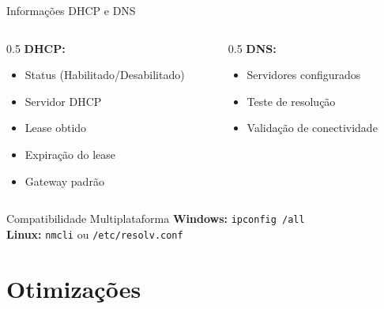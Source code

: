 \documentclass[aspectratio=169]{beamer}
\begin{document}
\begin{frame}{Informações DHCP e DNS}
\begin{columns}[T]
\begin{column}{0.5\textwidth}
\textbf{DHCP:}
\begin{itemize}
    \item Status (Habilitado/Desabilitado)
    \item Servidor DHCP
    \item Lease obtido
    \item Expiração do lease
    \item Gateway padrão
\end{itemize}
\end{column}

\begin{column}{0.5\textwidth}
\textbf{DNS:}
\begin{itemize}
    \item Servidores configurados
    \item Teste de resolução
    \item Validação de conectividade
\end{itemize}
\end{column}
\end{columns}

\vspace{0.5cm}

\begin{block}{Compatibilidade Multiplataforma}
\textbf{Windows:} \texttt{ipconfig /all} \\
\textbf{Linux:} \texttt{nmcli} ou \texttt{/etc/resolv.conf}
\end{block}
\end{frame}

\section{Otimizações}
\end{document}
